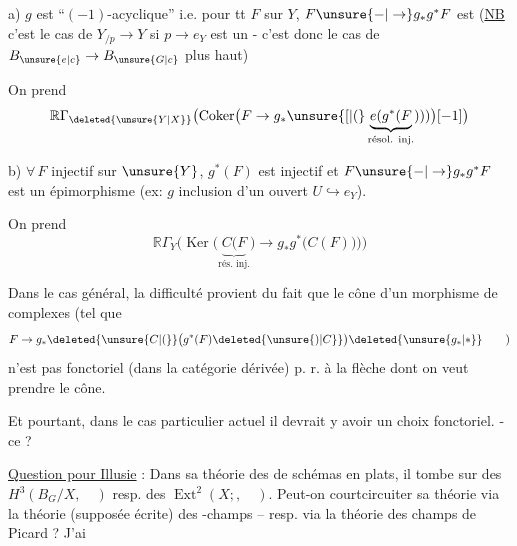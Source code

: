 a) $g$ est ``$(-1)$-acyclique'' i.e. pour tt $F$ sur $Y$, $F\unsure{\mathord{-}|\to}g_{*}g^{*}F$ est  (\uline{NB} c'est le cas de $Y_{/p}\to Y$ si $p\to e_{Y}$ est un  - c'est donc le cas de $B_{\unsure{e|c}}\to B_{\unsure{G|c}}$ plus haut)

On prend
\[
\mathbb R\Gamma_{\deleted{\unsure{Y|X}}}\bigl(\operatorname{Coker}\bigl(F\to g_{*}\unsure{[|(}\underbrace{e(g^{*}(F}_{\text{résol. inj.}})))\bigr)[-1]\bigr)
\]

b) $\forall\,F$ injectif sur $\unsure{Y}$, $g^{*}(F)$ est injectif et $F\unsure{\mathord{-}|\to}g_{*}g^{*}F$ est un épimorphisme (ex: $g$ inclusion d'un ouvert $U\hookrightarrow e_{Y}$).

On prend
\[
\mathbb R\Gamma_{Y}\bigl(\operatorname{Ker}\bigl(\underbrace{C(F}_{\text{rés. inj.}})\to g_{*}g^{*}\bigl(C(F)\bigr)\bigr)\bigr)
\]

Dans le cas général, la difficulté provient du fait que le cône d'un morphisme de complexes (tel que
\[
F\to g_{*}\deleted{\unsure{C|(}}\bigl(g^{*}(F)\deleted{\unsure{)|C}}\bigr)\deleted{\unsure{g_{*}|*}}\qquad\text{)}
\]
n'est pas fonctoriel (dans la catégorie dérivée) p. r. à la flèche dont on veut prendre le cône.

Et pourtant, dans le cas particulier actuel il devrait y avoir un choix fonctoriel. -ce  ?

\uline{Question pour Illusie} : Dans sa théorie des  de schémas en  plats, il tombe sur des $H^{3}(B_{G}/X,\quad)$ resp. des $\operatorname{Ext}^{2}(X;,\quad)$. Peut-on courtcircuiter sa théorie via la théorie (supposée écrite) des -champs -- resp. via la théorie des champs de Picard ? J'ai

